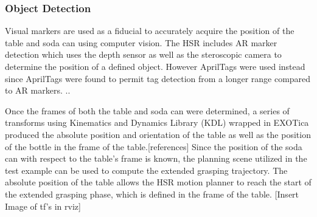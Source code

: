 \documentclass[12pt]{article}
\begin{document}
            \subsubsection{Object Detection}
                Visual markers are used as a fiducial to accurately acquire the position of the table and soda can using computer vision.
                The HSR includes AR marker detection which uses the depth sensor as well as the steroscopic camera to determine the position of a defined object. However AprilTags were used instead since AprilTags were found to permit tag detection from a longer range compared to AR markers. \cite{wang_apriltag_2016}.. 

                \par Once the frames of both the table and soda can were determined, a series of transforms using Kinematics and Dynamics Library (KDL)\cite{noauthor_kinematics_nodate} wrapped in EXOTica produced the absolute position and orientation of the table as well as the position of the bottle in the frame of the table.[references] Since the position of the soda can with respect to the table's frame is known, the planning scene utilized in the test example can be used to compute the extended grasping trajectory.
                 The absolute position of the table allows the HSR motion planner to reach the start of the extended grasping phase, which is defined in the frame of the table. [Insert Image of tf's in rviz]
\end{document}
